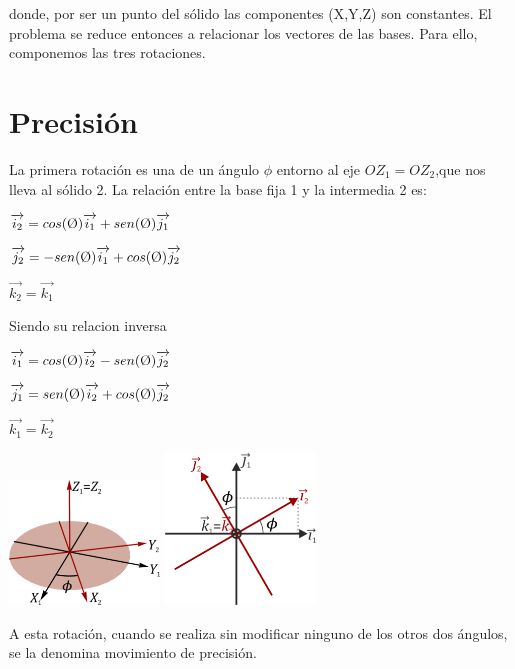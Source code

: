 \documentclass[12pt,a4paper]{report}
\begin{document}
donde, por ser un punto del sólido las componentes (X,Y,Z) son constantes. El problema se reduce entonces a relacionar los vectores de las bases. Para ello, componemos las tres rotaciones.

\section{Precisión}
La primera rotación es una de un ángulo $\phi$ entorno al eje $OZ_{1}=OZ_{2}$,que nos lleva al sólido 2. La relación entre la base fija 1 y la intermedia 2 es:
\begin{center}
 $\overrightarrow{i_{2}}=cos(\textrm \O)\overrightarrow{i_{1}}+sen(\textrm \O)\overrightarrow{j_{1}}$ 
 
 $\overrightarrow{j_{2}}=-sen(\textrm \O)\overrightarrow{i_{1}}+cos(\textrm \O)\overrightarrow{j_{2}}$
 
 $\overrightarrow{k_{2}}=\overrightarrow{k_{1}}$
 \end{center} 
Siendo su relacion inversa
\begin{center}
$\overrightarrow{i_{1}}=cos(\textrm \O)\overrightarrow{i_{2}}-sen(\textrm \O)\overrightarrow{j_{2}}$

$\overrightarrow{j_{1}}=sen(\textrm \O)\overrightarrow{i_{2}}+cos(\textrm \O)\overrightarrow{j_{2}}$

$\overrightarrow{k_{1}}=\overrightarrow{k_{2}}$
\end{center}
\begin{center}
\includegraphics[width=4cm]{2.png}
\includegraphics[width=4cm]{3.png} 
\end{center} 
A esta rotación, cuando se realiza sin modificar ninguno de los otros dos ángulos, se la denomina movimiento de precisión.
\end{document}
